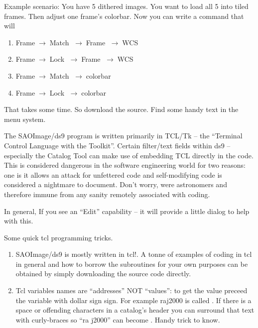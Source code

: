 \documentclass[letter,11pt,oneside]{article}
\newcommand{\menu}{\ensuremath{\;\rightarrow\;}}
\begin{document}
Example scenario: You have 5 dithered images. You want to load
all 5 into tiled frames. Then adjust one frame's colorbar. Now
you can write a command that will

\vspace{-.15cm}
\begin{enumerate}\addtolength{\itemsep}{-0.5\baselineskip}
   \item   Frame\menu Match \menu Frame \menu WCS
   \item   Frame\menu Lock \menu Frame \menu WCS
   \item   Frame\menu Match \menu colorbar
   \item   Frame\menu Lock \menu colorbar
\end{enumerate}


That takes some time. So download the source. Find some handy
text in the menu system.


The SAOImage/ds9 program is written primarily in TCL/Tk -- the
``Terminal Control Language with the Toolkit''. Certain filter/text
fields within ds9 -- especially the Catalog Tool can make use of
embedding TCL directly in the code. This is considered dangerous in
the software engineering world for two reasons: one is it allows an
attack for unfettered code and self-modifying code is considered a
nightmare to document. Don't worry, were astronomers and therefore
immune from any sanity remotely associated with coding.

In general, If you see an ``Edit'' capability -- it will provide
a little dialog to help with this.

Some quick tcl programming tricks.

\vspace{-.15cm}
\begin{enumerate}\addtolength{\itemsep}{-0.5\baselineskip}
\item   SAOImage/ds9 is mostly written in tcl!. A tonne of examples
  of coding in tcl in general and how to borrow the subroutines for
  your own purposes can be obtained by simply downloading the source
  code directly.

   \item   Tcl variables names are ``addresses'' NOT ``values'':
to get the value preceed the variable with dollar sign
{\color{verbcolor}{\verb#$#}} sign. For example raj2000 is called
{\color{verbcolor}{\verb#$raj2000#}}. If there is a space or offending
characters in a catalog's header you can surround that text with
curly-braces {\color{verbcolor}{\verb#{}#}} so ``ra j2000'' can become
{}. Handy trick to know.
\end{enumerate}
\end{document}
